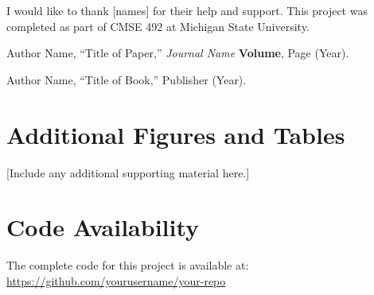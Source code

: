 \documentclass[aps,prl,preprint,groupedaddress]{revtex4-2}
\begin{document}
\begin{acknowledgments}
I would like to thank [names] for their help and support. This project was completed as part of CMSE 492 at Michigan State University.
\end{acknowledgments}

% 

\begin{thebibliography}{99}

Author Name,
``Title of Paper,''
\textit{Journal Name} \textbf{Volume}, Page (Year).

Author Name,
``Title of Book,''
Publisher (Year).


\end{thebibliography}

\appendix

\section{Additional Figures and Tables}
\label{app:additional}

[Include any additional supporting material here.]

\section{Code Availability}
\label{app:code}

The complete code for this project is available at: \url{https://github.com/yourusername/your-repo}
\end{document}

